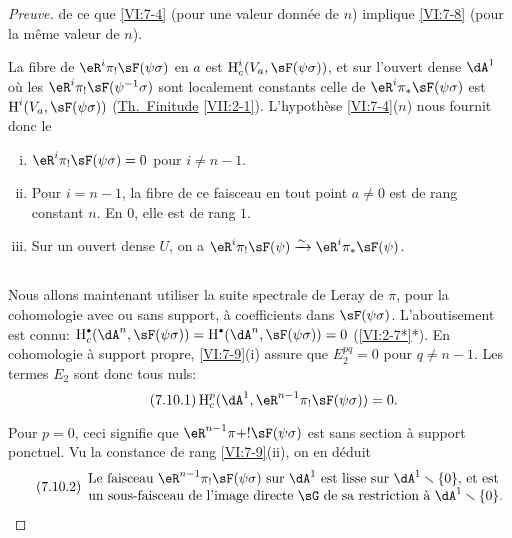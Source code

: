 \begin{proof}[Preuve]
de ce que \ref{VI:7-4} (pour une valeur donn\'ee de $n$) implique \ref{VI:7-8} 
(pour la m\^eme valeur de $n$). 

La fibre de $\eR^i \pi_! \sF(\psi\sigma)$ en $a$ est 
$\h_c^i(V_a,\sF(\psi\sigma))$, et sur l'ouvert dense $\dA^1$ o\`u les 
$\eR^i \pi_!\sF(\psi^{-1}\sigma)$ sont localement constants celle de 
$\eR^i \pi_\ast \sF(\psi\sigma)$ est $\h^i(V_a,\sF(\psi\sigma))$ 
(\hyperlink{VII}{Th.\ Finitude} \ref{VII:2-1}). L'hypoth\`ese \ref{VI:7-4}($n$) 
nous fournit donc le 





\begin{lemma_}\label{VI:7-9}
\begin{enumerate}[(i)]
  \item $\eR^i \pi_! \sF(\psi\sigma)=0$ pour $i\ne n-1$. 
  \item Pour $i=n-1$, la fibre de ce faisceau en tout point $a\ne 0$ est de rang 
    constant $n$. En $0$, elle est de rang $1$. 
  \item Sur un ouvert dense $U$, on a 
    $\eR^i \pi_! \sF(\psi) \iso \eR^i \pi_\ast \sF(\psi)$. 
\end{enumerate}
\end{lemma_}





\subsection{}\label{VI:7-10}

Nous allons maintenant utiliser la suite spectrale de Leray de $\pi$, pour la 
cohomologie avec ou sans support, \`a coefficients dans $\sF(\psi\sigma)$. 
L'aboutisement est connu: 
$\h_c^\bullet(\dA^n,\sF(\psi\sigma))=\h^\bullet(\dA^n,\sF(\psi\sigma)) = 0$ 
(\ref{VI:2-7*}*). En cohomologie \`a support propre, \ref{VI:7-9}(i) assure que 
$E_2^{pq}=0$ pour $q\ne n-1$. Les termes $E_2$ sont donc tous nuls: 
\begin{equation*}\tag{7.10.1}\label{VI:eq:7-10-1}
  \h_c^p(\dA^1,\eR^{n-1} \pi_!\sF(\psi\sigma)) = 0 \text{.} 
\end{equation*}

Pour $p=0$, ceci signifie que $\eR^{n-1}\pi+! \sF(\psi\sigma)$ est sans section 
\`a support ponctuel. Vu la constance de rang \ref{VI:7-9}(ii), on en d\'eduit 
\begin{equation*}\tag{7.10.2}\label{VI:eq:7-10-2}
  \begin{array}{c}
    \text{Le faisceau $\eR^{n-1} \pi_! \sF(\psi\sigma)$ sur $\dA^1$ est lisse sur $\dA^1\setminus \{0\}$, et est } \\ 
    \text{un sous-faisceau de l'image directe $\sG$ de sa restriction \`a $\dA^1\setminus \{0\}$.}
  \end{array}
\end{equation*}


\end{proof}
